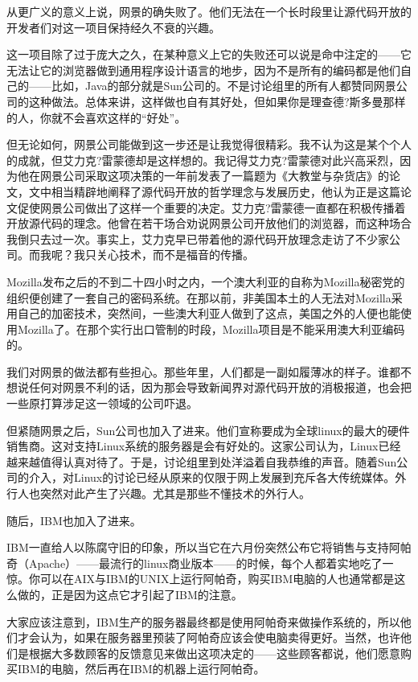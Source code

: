 从更广义的意义上说，网景的确失败了。他们无法在一个长时段里让源代码开放的开发者们对这一项目保持经久不衰的兴趣。

这一项目除了过于庞大之久，在某种意义上它的失败还可以说是命中注定的——它无法让它的浏览器做到通用程序设计语言的地步，因为不是所有的编码都是他们自己的——比如，Java的部分就是Sun公司的。不是讨论组里的所有人都赞同网景公司的这种做法。总体来讲，这样做也自有其好处，但如果你是理查德?斯多曼那样的人，你就不会喜欢这样的“好处”。

但无论如何，网景公司能做到这一步还是让我觉得很精彩。我不认为这是某个个人的成就，但艾力克?雷蒙德却是这样想的。我记得艾力克?雷蒙德对此兴高采烈，因为他在网景公司采取这项决策的一年前发表了一篇题为《大教堂与杂货店》的论文，文中相当精辟地阐释了源代码开放的哲学理念与发展历史，他认为正是这篇论文促使网景公司做出了这样一个重要的决定。艾力克?雷蒙德一直都在积极传播着开放源代码的理念。他曾在若干场合劝说网景公司开放他们的浏览器，而这种场合我倒只去过一次。事实上，艾力克早已带着他的源代码开放理念走访了不少家公司。而我呢？我只关心技术，而不是福音的传播。

Mozilla发布之后的不到二十四小时之内，一个澳大利亚的自称为Mozilla秘密党的组织便创建了一套自己的密码系统。在那以前，非美国本土的人无法对Mozilla采用自己的加密技术，突然间，一些澳大利亚人做到了这点，美国之外的人便也能使用Mozilla了。在那个实行出口管制的时段，Mozilla项目是不能采用澳大利亚编码的。

我们对网景的做法都有些担心。那些年里，人们都是一副如履薄冰的样子。谁都不想说任何对网景不利的话，因为那会导致新闻界对源代码开放的消极报道，也会把一些原打算涉足这一领域的公司吓退。

但紧随网景之后，Sun公司也加入了进来。他们宣称要成为全球linux的最大的硬件销售商。这对支持Linux系统的服务器是会有好处的。这家公司认为，Linux已经越来越值得认真对待了。于是，讨论组里到处洋溢着自我恭维的声音。随着Sun公司的介入，对Linux的讨论已经从原来的仅限于网上发展到充斥各大传统媒体。外行人也突然对此产生了兴趣。尤其是那些不懂技术的外行人。

随后，IBM也加入了进来。

IBM一直给人以陈腐守旧的印象，所以当它在六月份突然公布它将销售与支持阿帕奇（Apache）——最流行的linux商业版本——的时候，每个人都着实地吃了一惊。你可以在AIX与IBM的UNIX上运行阿帕奇，购买IBM电脑的人也通常都是这么做的，正是因为这点它才引起了IBM的注意。

大家应该注意到，IBM生产的服务器最终都是使用阿帕奇来做操作系统的，所以他们才会认为，如果在服务器里预装了阿帕奇应该会使电脑卖得更好。当然，也许他们是根据大多数顾客的反馈意见来做出这项决定的——这些顾客都说，他们愿意购买IBM的电脑，然后再在IBM的机器上运行阿帕奇。

